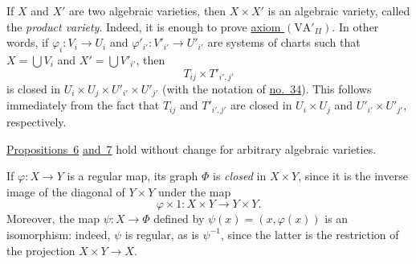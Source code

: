 If $X$ and $X'$ are two algebraic varieties, then $X\times X'$ is an algebraic variety, called the \textit{product variety}. Indeed, it is enough to prove \hyperref[fac:II:1:no:34:axiom:VA-II-prime]{axiom $(\mathrm{VA}'_{II})$}. In other words, if $\varphi_i:V_i\to U_i$ and $\varphi'_{i'}:V'_{i'}\to U'_{i'}$ are systems of charts such that $X=\bigcup V_i$ and $X'=\bigcup V'_{i'}$, then
\[
T_{ij}\times T'_{i',j'}
\]
is closed in $U_i\times U_j\times U'_{i'}\times U'_{j'}$ (with the notation of \hyperref[fac:II:1:no:34]{no.~34}). This follows immediately from the fact that $T_{ij}$ and $T'_{i',j'}$ are closed in $U_i\times U_j$ and $U'_{i'}\times U'_{j'}$, respectively.

\hyperref[fac:II:1:no:33:prop:6]{Propositions~6} \hyperref[fac:II:1:no:33:prop:7]{and~7} hold without change for arbitrary algebraic varieties.

If $\varphi:X\to Y$ is a regular map, its graph $\Phi$ is \textit{closed} in $X\times Y$, since it is the inverse image of the diagonal of $Y\times Y$ under the map
\[
\varphi\times 1:X\times Y\longrightarrow Y\times Y.
\]
Moreover, the map $\psi:X\to\Phi$ defined by $\psi(x)=(x,\varphi(x))$ is an isomorphism: indeed, $\psi$ is regular, as is $\psi^{-1}$, since the latter is the restriction of the projection $X\times Y\to X$.
